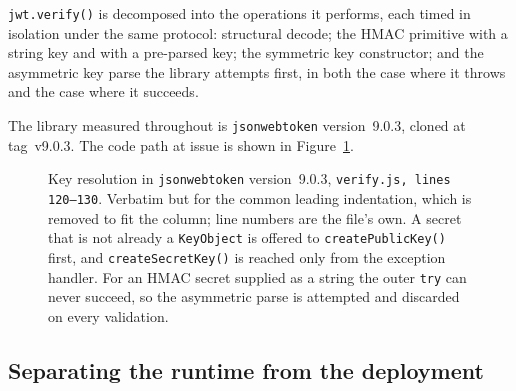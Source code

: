 \documentclass[pdflatex,sn-basic,twocolumn]{sn-jnl}%
\newcommand{\LibraryName}{\texttt{jsonwebtoken}}
\newcommand{\LibraryVersion}{version~9.0.3}
\newcommand{\LibraryTag}{tag~v9.0.3}
\newcommand{\CodeFileLines}{verify.js, lines 120--130}
\newcommand{\CodeFirstLine}{120}
\newcommand{\CodeExcerptHash}{sha256:4c4781826f49fa90}
\providecommand{\DIFdelbegin}{} %
\providecommand{\DIFaddbeginFL}{} %
\providecommand{\DIFaddendFL}{} %
\providecommand{\DIFdelbeginFL}{} %
\providecommand{\DIFdelendFL}{} %
\newcommand{\DIFscaledelfig}{0.5}
\newlength{\DIFdelgraphicswidth} %
\newlength{\DIFdelgraphicsheight} %
\newcommand{\DIFaddincludegraphics}[2][]{{\color{blue}\fbox{\DIFOincludegraphics[#1]{#2}}}} %
\newcommand{\DIFdelincludegraphics}[2][]{%
\sbox{\DIFdelgraphicsbox}{\DIFOincludegraphics[#1]{#2}}%
\settoboxwidth{\DIFdelgraphicswidth}{\DIFdelgraphicsbox} %
\settoboxtotalheight{\DIFdelgraphicsheight}{\DIFdelgraphicsbox} %
\scalebox{\DIFscaledelfig}{%
\parbox[b]{\DIFdelgraphicswidth}{\usebox{\DIFdelgraphicsbox}\\[-\baselineskip] \rule{\DIFdelgraphicswidth}{0em}}\llap{\resizebox{\DIFdelgraphicswidth}{\DIFdelgraphicsheight}{%
\setlength{\unitlength}{\DIFdelgraphicswidth}%
\begin{picture}(1,1)%
\thicklines\linethickness{2pt} %
{\color[rgb]{1,0,0}\put(0,0){\framebox(1,1){}}}%
{\color[rgb]{1,0,0}\put(0,0){\line( 1,1){1}}}%
{\color[rgb]{1,0,0}\put(0,1){\line(1,-1){1}}}%
\end{picture}%
}\hspace*{3pt}}} %
} %
\DeclareRobustCommand{\DIFdelbegin}{\DIFOdelbegin \let\includegraphics\DIFdelincludegraphics} %
\DeclareRobustCommand{\DIFaddbeginFL}{\DIFOaddbeginFL \let\includegraphics\DIFaddincludegraphics} %
\DeclareRobustCommand{\DIFaddendFL}{\DIFOaddendFL \let\includegraphics\DIFOincludegraphics} %
\DeclareRobustCommand{\DIFdelbeginFL}{\DIFOdelbeginFL \let\includegraphics\DIFdelincludegraphics} %
\DeclareRobustCommand{\DIFdelendFL}{\DIFOaddendFL \let\includegraphics\DIFOincludegraphics} %
\begin{document}
\texttt{jwt.verify()} is decomposed into the operations it performs, each timed
in isolation under the same protocol: structural decode; the HMAC primitive with
a string key and with a pre-parsed key; the symmetric key constructor; and the
asymmetric key parse the library attempts first, in both the case where it
throws and the case where it succeeds.

The library measured throughout is \LibraryName{} \LibraryVersion{}, cloned at
\LibraryTag. The code path at issue is shown in Figure~\ref{fig:codepath}.

\DIFdelbegin %
\DIFdelendFL \DIFaddbeginFL \begin{figure}[!htbp]
\DIFaddendFL 
\DIFdelbeginFL %
\DIFdelendFL \DIFaddbeginFL \caption{Key resolution in \LibraryName{} \LibraryVersion{},
\texttt{\CodeFileLines}. Verbatim but for the common leading indentation,
which is removed to fit the column; line numbers are the file's own. A secret
that is not already a \texttt{KeyObject} is offered to
\texttt{createPublicKey()} first, and \texttt{createSecretKey()} is reached only
from the exception handler. For an HMAC secret supplied as a string the outer
\texttt{try} can never succeed, so the asymmetric parse is attempted and
discarded on every validation.}
\DIFaddendFL \label{fig:codepath}
\end{figure}

\subsection{Separating the runtime from the deployment}\label{sec:matrix-method}
\end{document}
